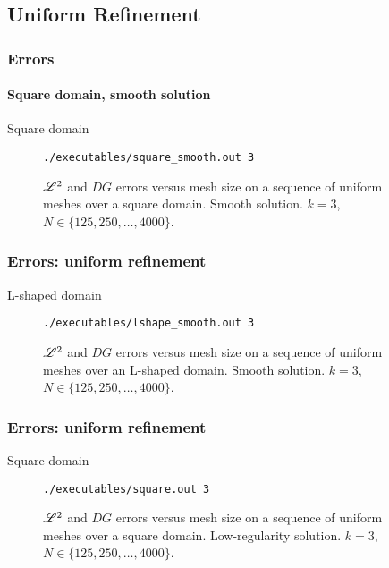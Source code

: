 \subsection{Uniform Refinement}

\begin{frame}[fragile]
    \frametitle{Errors}
    \framesubtitle{Square domain, smooth solution}

    \begin{description}
        \item[Square domain] \lstinline{./executables/square_smooth.out 3}
    \end{description}    

    \begin{figure}[!ht]
        
        \caption{$\mathscr{L}^2$ and $DG$ errors versus mesh size on a sequence of uniform meshes over a square domain. Smooth solution. $k = 3$, $N \in \{125, 250, \dots, 4000\}$.}
    \end{figure}
\end{frame}

\begin{frame}[fragile]
    \frametitle{Errors: uniform refinement}

    \begin{description}
        \item[L-shaped domain] \lstinline{./executables/lshape_smooth.out 3}
    \end{description}

    \begin{figure}[!ht]
        
        \caption{$\mathscr{L}^2$ and $DG$ errors versus mesh size on a sequence of uniform meshes over an L-shaped domain. Smooth solution. $k = 3$, $N \in \{125, 250, \dots, 4000\}$.}
    \end{figure}
\end{frame}

\begin{frame}[fragile]
    \frametitle{Errors: uniform refinement}

    \begin{description}
        \item[Square domain] \lstinline{./executables/square.out 3}
    \end{description}    

    \begin{figure}[!ht]
        
        \caption{$\mathscr{L}^2$ and $DG$ errors versus mesh size on a sequence of uniform meshes over a square domain. Low-regularity solution. $k = 3$, $N \in \{125, 250, \dots, 4000\}$.}
    \end{figure}
\end{frame}

